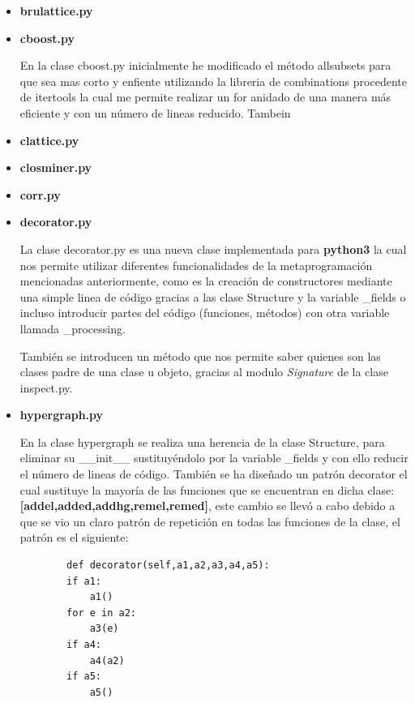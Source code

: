 \documentclass{cosas/tfg_domingo}
\begin{document}
\begin{itemize}

\item \textbf{brulattice.py}

\item \textbf{cboost.py}

En la clase cboost.py inicialmente he modificado el método allsubsets para que sea mas corto y enfiente utilizando la libreria de combinations procedente de itertools la cual me permite realizar un for anidado de una manera más eficiente y con un número de lineas reducido.
Tambein 

\item \textbf{clattice.py}

\item \textbf{closminer.py}

\item \textbf{corr.py}

\item \textbf{decorator.py}

La clase decorator.py es una nueva clase implementada para \textbf{python3} la cual nos permite utilizar diferentes funcionalidades de la metaprogramación mencionadas anteriormente, como es la creación de constructores mediante una simple linea de código gracias a las clase Structure  y la variable \_fields o incluso introducir partes del código (funciones, métodos) con otra variable llamada \_processing.

También se introducen un método que nos permite saber quienes son las clases padre de una clase u objeto, gracias al modulo \textit{Signature} de la clase inspect.py.

\item \textbf{hypergraph.py}

En la clase hypergraph se realiza una herencia de la clase Structure, para eliminar su \_\_init\_\_ sustituyéndolo por la variable \_fields y con ello reducir el número de lineas de código.
También se ha diseñado un patrón decorator el cual sustituye la mayoría de las funciones que se encuentran en dicha clase:  \textbf{[addel,added,addhg,remel,remed]}, este cambio se llevó a cabo debido a que se vio un claro patrón de repetición en todas las funciones de la clase, el patrón es el siguiente:

\begin{verbatim}
        def decorator(self,a1,a2,a3,a4,a5):
        if a1:
            a1()
        for e in a2:
            a3(e)
        if a4:
            a4(a2)
        if a5:
            a5()
\end{verbatim}


\end{itemize}
\end{document}
